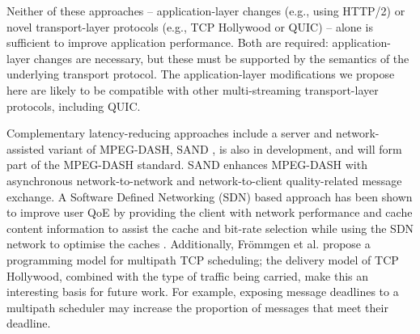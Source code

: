 Neither of these approaches -- application-layer changes (e.g., using HTTP/2) or 
novel transport-layer protocols (e.g., TCP Hollywood or QUIC) -- alone is sufficient to
improve application performance. Both are required: application-layer changes are
necessary, but these must be supported by the semantics of the underlying transport
protocol. The application-layer modifications we propose here are likely to be compatible
with other multi-streaming transport-layer protocols, including QUIC.

Complementary latency-reducing approaches include a server and network-assisted variant
of MPEG-DASH, SAND \cite{thomas2015enhancing}, is also in development, and will form part
of the MPEG-DASH standard. SAND enhances MPEG-DASH with asynchronous network-to-network
and network-to-client quality-related message exchange. A Software Defined Networking
(SDN) based approach has been shown to improve user QoE by providing the client with
network performance and cache content information to assist the cache and bit-rate
selection while using the SDN network to optimise the caches \cite{bhat2017network}.
Additionally, Fr\"ommgen et al. \cite{frommgen2017programming} propose a programming model
for multipath TCP scheduling; the delivery model of TCP Hollywood, combined with the type
of traffic being carried, make this an interesting basis for future work. For example,
exposing message deadlines to a multipath scheduler may increase the proportion of
messages that meet their deadline.